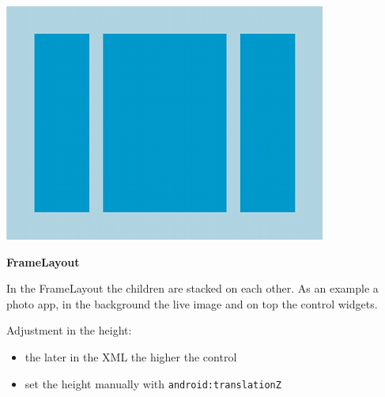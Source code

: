 \documentclass[11pt,twoside,landscape]{article}
\begin{document}
\begin{multicols}{3}
\begin{center}
\includegraphics[width=.9\linewidth]{img/linearlayout.png}
\end{center}

\textbf{FrameLayout}

In the FrameLayout the children are stacked on each other.
As an example a photo app, in the background the live image and on top the control widgets. 


Adjustment in the height:
\begin{itemize}
\item the later in the XML the higher the control
\item set the height manually with \texttt{android:translationZ}
\end{itemize}



\end{multicols}
\end{document}
